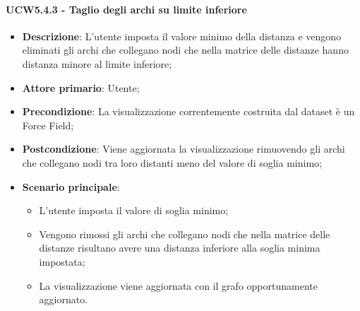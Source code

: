 \paragraph{UCW5.4.3 - Taglio degli archi su limite inferiore}
\label{par:ucw5.4.3}
\begin{itemize}
    \item \textbf{Descrizione}:     L'utente imposta il valore minimo della distanza e vengono eliminati gli archi che collegano nodi che nella matrice delle distanze hanno distanza minore al limite inferiore;
    \item \textbf{Attore primario}: Utente;
    \item \textbf{Precondizione}:   La visualizzazione correntemente costruita dal dataset è un Force Field;
    \item \textbf{Postcondizione}:  Viene aggiornata la visualizzazione rimuovendo gli archi  che collegano nodi tra loro distanti meno del valore di soglia minimo;
    \item \textbf{Scenario principale}:
    \begin{itemize}
        \item L'utente imposta il valore di soglia minimo;
        \item Vengono rimossi gli archi che collegano nodi che nella matrice delle distanze risultano avere una distanza inferiore alla soglia minima impostata;
        \item La visualizzazione viene aggiornata con il grafo opportunamente aggiornato.
    \end{itemize}
\end{itemize}

